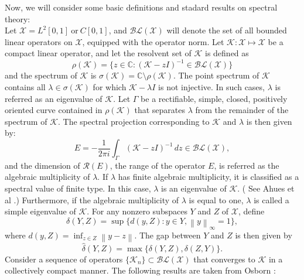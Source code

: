 \documentclass[pdflatex, sn-mathphys-num]{sn-jnl}%
\newcommand{\norm}[1]{\left\lVert #1\right\rVert}
\theoremstyle{thmstyleone}%
\theoremstyle{thmstyletwo}%
\theoremstyle{thmstylethree}%
\begin{document}
Now, we will consider some basic definitions and stadard results on spectral theory:\\
Let $\mathcal{X} = L^2[0,1] ~\text{or}~ C[0, 1]$, and $\mathcal{BL}(\mathcal{X})$ will denote the set of all bounded linear operators on $\mathcal{X}$, equipped with the operator norm. Let  $\mathcal{K} : \mathcal{X} \mapsto \mathcal{X}$ be a compact linear operator, and let the resolvent set of $\mathcal{K}$ is defined as 
\[
\rho(\mathcal{K}) = \{ z \in \mathbb{C} : (\mathcal{K} - zI)^{-1} \in \mathcal{BL}(\mathcal{X}) \}
\]
and the spectrum of $\mathcal{K}$ is $\sigma(\mathcal{K}) = \mathbb{C} \setminus \rho(\mathcal{K})$. The point spectrum of $\mathcal{K}$ contains all $\lambda \in \sigma(\mathcal{K})$ for which $\mathcal{K} - \lambda I$ is not injective. In such cases, $\lambda$ is referred as an eigenvalue of $\mathcal{K}$. Let $\Gamma$ be a rectifiable, simple, closed, positively oriented curve contained in $\rho(\mathcal{K})$ that separates $\lambda$ from the remainder of the spectrum of $\mathcal{K}$. The spectral projection corresponding to  $\mathcal{K}$ and $\lambda$ is then given by:
\[
E = -\frac{1}{2\pi i} \int_{\Gamma} (\mathcal{K} - zI)^{-1} \, dz \in  \mathcal{BL}(\mathcal{X}),
\]
and the dimension of $\mathcal{R}(E)$, the range of the operator $E$, is referred as the algebraic multiplicity of $\lambda$. If $\lambda$ has finite algebraic multiplicity, it is classified as a spectral value of finite type. In this case, $\lambda$ is an eigenvalue of $\mathcal{K}$. ( See Ahues et al \cite[Proposition 1.31]{Ahues}.) Furthermore, if the algebraic multiplicity of $\lambda$ is equal to one, $\lambda$ is called a simple eigenvalue of $\mathcal{K}$. For any nonzero subspaces $Y$ and $Z$ of $\mathcal{X}$, define 
\[
\delta(Y, Z) = \sup \{d(y, Z) : y \in Y, \norm{y}_\infty = 1\},
\]
where $d(y, Z) = \inf_{z \in Z} \norm{y - z}$. The gap between $Y$ and $Z$ is then given by  
\[
\hat{\delta}(Y, Z) = \max\{\delta(Y, Z), \delta(Z, Y)\}.
\]	
Consider a sequence of operators $\{\mathcal{K}_n\} \subset \mathcal{BL}(\mathcal{X})$ that converges to $\mathcal{K}$ in a collectively compact manner. The following results are taken from Osborn \cite{Osborn}:  
\end{document}
